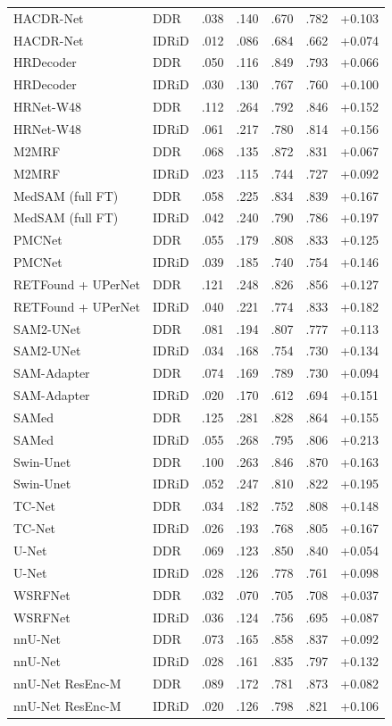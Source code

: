 {\begin{longtable}{l l c c c c c}
HACDR-Net & DDR & .038 & .140 & .670 & .782 & +0.103 \\
HACDR-Net & IDRiD & .012 & .086 & .684 & .662 & +0.074 \\
HRDecoder & DDR & .050 & .116 & .849 & .793 & +0.066 \\
HRDecoder & IDRiD & .030 & .130 & .767 & .760 & +0.100 \\
HRNet-W48 & DDR & .112 & .264 & .792 & .846 & +0.152 \\
HRNet-W48 & IDRiD & .061 & .217 & .780 & .814 & +0.156 \\
M2MRF & DDR & .068 & .135 & .872 & .831 & +0.067 \\
M2MRF & IDRiD & .023 & .115 & .744 & .727 & +0.092 \\
MedSAM (full FT) & DDR & .058 & .225 & .834 & .839 & +0.167 \\
MedSAM (full FT) & IDRiD & .042 & .240 & .790 & .786 & +0.197 \\
PMCNet & DDR & .055 & .179 & .808 & .833 & +0.125 \\
PMCNet & IDRiD & .039 & .185 & .740 & .754 & +0.146 \\
RETFound + UPerNet & DDR & .121 & .248 & .826 & .856 & +0.127 \\
RETFound + UPerNet & IDRiD & .040 & .221 & .774 & .833 & +0.182 \\
SAM2-UNet & DDR & .081 & .194 & .807 & .777 & +0.113 \\
SAM2-UNet & IDRiD & .034 & .168 & .754 & .730 & +0.134 \\
SAM-Adapter & DDR & .074 & .169 & .789 & .730 & +0.094 \\
SAM-Adapter & IDRiD & .020 & .170 & .612 & .694 & +0.151 \\
SAMed & DDR & .125 & .281 & .828 & .864 & +0.155 \\
SAMed & IDRiD & .055 & .268 & .795 & .806 & +0.213 \\
Swin-Unet & DDR & .100 & .263 & .846 & .870 & +0.163 \\
Swin-Unet & IDRiD & .052 & .247 & .810 & .822 & +0.195 \\
TC-Net & DDR & .034 & .182 & .752 & .808 & +0.148 \\
TC-Net & IDRiD & .026 & .193 & .768 & .805 & +0.167 \\
U-Net & DDR & .069 & .123 & .850 & .840 & +0.054 \\
U-Net & IDRiD & .028 & .126 & .778 & .761 & +0.098 \\
WSRFNet & DDR & .032 & .070 & .705 & .708 & +0.037 \\
WSRFNet & IDRiD & .036 & .124 & .756 & .695 & +0.087 \\
nnU-Net & DDR & .073 & .165 & .858 & .837 & +0.092 \\
nnU-Net & IDRiD & .028 & .161 & .835 & .797 & +0.132 \\
nnU-Net ResEnc-M & DDR & .089 & .172 & .781 & .873 & +0.082 \\
nnU-Net ResEnc-M & IDRiD & .020 & .126 & .798 & .821 & +0.106 \\
\end{longtable}
}
\vspace{-6pt}
